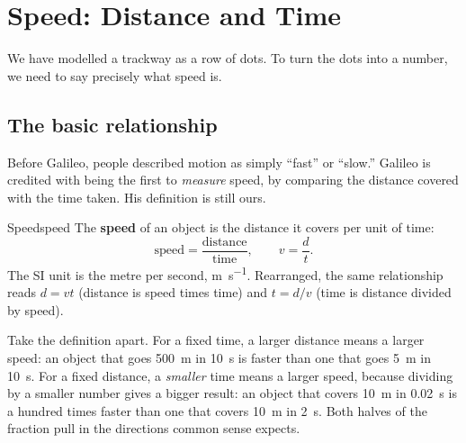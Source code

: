 
\section{Speed: Distance and Time}
\label{sec:speed}

We have modelled a trackway as a row of dots. To turn the dots into a number, we need to say precisely what speed is.

\subsection{The basic relationship}

Before Galileo, people described motion as simply ``fast'' or ``slow.'' Galileo is credited with being the first to \emph{measure} speed, by comparing the distance covered with the time taken. His definition is still ours.

\begin{definition}{Speed}{speed}
The \textbf{speed} of an object is the distance it covers per unit of time:
\[
\text{speed} = \frac{\text{distance}}{\text{time}}, \qquad v = \frac{d}{t}.
\]
The SI unit is the metre per second, \si{\metre\per\second}. Rearranged, the same relationship reads $d = v t$ (distance is speed times time) and $t = d/v$ (time is distance divided by speed).
\end{definition}

Take the definition apart. For a fixed time, a larger distance means a larger speed: an object that goes \SI{500}{\metre} in \SI{10}{\second} is faster than one that goes \SI{5}{\metre} in \SI{10}{\second}. For a fixed distance, a \emph{smaller} time means a larger speed, because dividing by a smaller number gives a bigger result: an object that covers \SI{10}{\metre} in \SI{0.02}{\second} is a hundred times faster than one that covers \SI{10}{\metre} in \SI{2}{\second}. Both halves of the fraction pull in the directions common sense expects.

